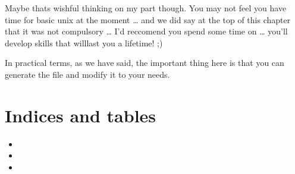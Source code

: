 \documentclass[letterpaper,10pt,english]{sphinxmanual}
\begin{document}
Maybe thats wishful thinking on my part though. You may not feel you have time for basic unix at the moment … and we did say at the top of this chapter that it was not compulsory … I’d reccomend you  spend some time on  … you’ll develop skills that willlast you a lifetime! ;\sphinxhyphen{})

In practical terms, as we have said, the important thing here is that you can generate the file  and modify it to your needs.

{
\begin{sphinxVerbatim}[commandchars=\\\{\}]
\llap{\color{nbsphinxin}[ ]:\,\hspace{\fboxrule}\hspace{\fboxsep}}
\end{sphinxVerbatim}
}


\chapter{Indices and tables}
\label{\detokenize{index:indices-and-tables}}\begin{itemize}
\item {} 

\item {} 

\item {} 

\end{itemize}



\renewcommand{\indexname}{Index}
\printindex
\end{document}
